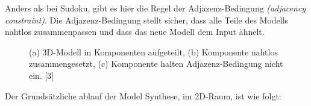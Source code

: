 \documentclass[12pt]{report}
\begin{document}
Anders als bei Sudoku, gibt es hier die Regel der Adjazenz-Bedingung \textit{(adjacency constraint)}.
Die Adjazenz-Bedingung stellt sicher, dass alle Teile des Modells nahtlos zusammenpassen und dass das neue Modell dem Input ähnelt.

\begin{figure}[H]
    \centering
    \qquad
    \qquad
    \caption{(a) 3D-Modell in Komponenten aufgeteilt, (b) Komponente nahtlos zusammengesetzt, (c) Komponente halten Adjazenz-Bedingung nicht ein. [3]}%
\end{figure}

Der Grundsätzliche ablauf der Model Synthese, im 2D-Raum, ist wie folgt:
\end{document}
